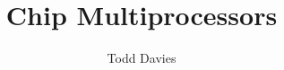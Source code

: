 \newcommand{\coursename}{Chip Multiprocessors}
\newcommand{\coursecode}{COMP35112}
\newcommand{\courseinfo}{}
\newcommand{\Author}{Todd Davies} 
\newcommand{\Title}{Chip Multiprocessors}
\author{\Author}
\title{\Title}

\newcommand\commit{%
  \ifdefined\commitId
    Commit: \texttt{\commitId}
  \fi
}
\newcommand\build{%
  \ifdefined\buildId
    Build: \texttt{\buildId}
  \fi
}